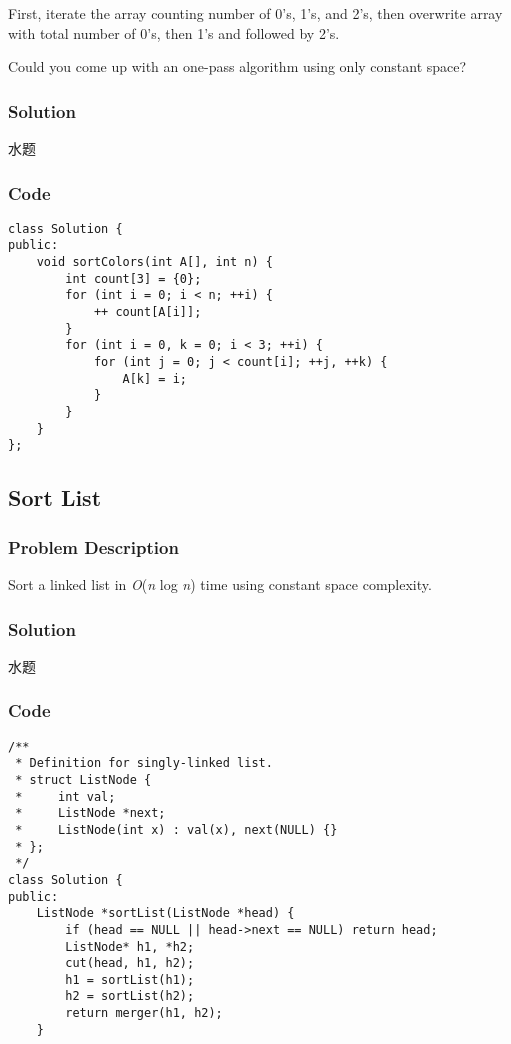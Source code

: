\documentclass[courier]{article}
\begin{document}
\begin{CJK*}{UTF8}{gkai}
First, iterate the array counting number of 0's, 1's, and 2's, then overwrite array with total number of 0's, then 1's and followed by 2's.

Could you come up with an one-pass algorithm using only constant space?



\subsubsection*{Solution}
水题

\subsubsection*{Code}
\begin{lstlisting}
class Solution {
public:
    void sortColors(int A[], int n) {
        int count[3] = {0};
        for (int i = 0; i < n; ++i) {
            ++ count[A[i]];
        }
        for (int i = 0, k = 0; i < 3; ++i) {
            for (int j = 0; j < count[i]; ++j, ++k) {
                A[k] = i;
            }
        }
    }
}; 
\end{lstlisting}


\subsection{ Sort List }

\subsubsection*{Problem Description}
Sort a linked list in \emph{O}(\emph{n} log \emph{n}) time using constant space complexity.



\subsubsection*{Solution}
水题

\subsubsection*{Code}
\begin{lstlisting}
/**
 * Definition for singly-linked list.
 * struct ListNode {
 *     int val;
 *     ListNode *next;
 *     ListNode(int x) : val(x), next(NULL) {}
 * };
 */
class Solution {
public:
    ListNode *sortList(ListNode *head) {
        if (head == NULL || head->next == NULL) return head;
        ListNode* h1, *h2;
        cut(head, h1, h2);
        h1 = sortList(h1);
        h2 = sortList(h2);
        return merger(h1, h2);
    }
    

\end{lstlisting}
\end{CJK*}
\end{document}
